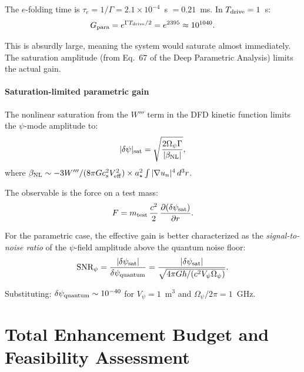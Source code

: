 \documentclass[12pt,aps,prd,twocolumn,superscriptaddress,nofootinbib]{revtex4-2}
\newcommand{\Opsi}{\Omega_\psi}
\newcommand{\ee}[1]{\times 10^{#1}}
\begin{document}
The $e$-folding time is $\tau_e = 1/\Gamma = 2.1\ee{-4}$~s $= 0.21$~ms.
In $T_{\rm drive} = 1$~s:
\begin{equation}
G_{\rm para} = e^{\Gamma T_{\rm drive}/2} = e^{2395} \approx 10^{1040}.
\end{equation}

This is absurdly large, meaning the system would saturate almost
immediately. The saturation amplitude (from Eq.~67 of the Deep
Parametric Analysis) limits the actual gain.

\subsection{Saturation-limited parametric gain}

The nonlinear saturation from the $W'''$ term in the DFD kinetic
function limits the $\psi$-mode amplitude to:
\begin{equation}\label{eq:sat-amplitude}
|\delta\psi|_{\rm sat} = \sqrt{\frac{2\Opsi\Gamma}{|\beta_{\rm NL}|}},
\end{equation}
where $\beta_{\rm NL} \sim -3W'''/(8\pi G c_s^2 V_{\rm eff}^2)
\times a_\star^2 \int |\nabla u_n|^4\,d^3r$.

The observable is the force on a test mass:
\begin{equation}\label{eq:force-sat}
F = m_{\rm test}\,\frac{c^2}{2}\,\frac{\partial(\delta\psi_{\rm sat})}
{\partial r}.
\end{equation}

For the parametric case, the effective gain is better characterized
as the \emph{signal-to-noise ratio} of the $\psi$-field amplitude
above the quantum noise floor:
\begin{equation}\label{eq:SNR-para}
\text{SNR}_\psi = \frac{|\delta\psi_{\rm sat}|}{\delta\psi_{\rm quantum}}
= \frac{|\delta\psi_{\rm sat}|}{\sqrt{4\pi G\hbar/(c^2 V_\psi\Opsi)}}.
\end{equation}

Substituting: $\delta\psi_{\rm quantum} \sim 10^{-40}$ for
$V_\psi = 1$~m$^3$ and $\Opsi/2\pi = 1$~GHz.


\part{Total Enhancement Budget and Feasibility Assessment}
\end{document}
